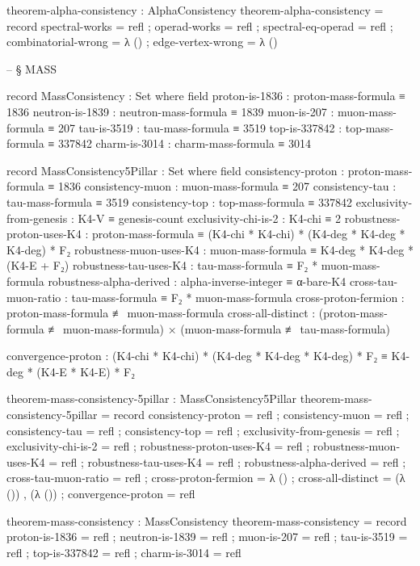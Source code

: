 \documentclass[11pt,a4paper]{book}
\begin{document}
\begin{code}
theorem-alpha-consistency : AlphaConsistency
theorem-alpha-consistency = record
  { spectral-works     = refl
  ; operad-works       = refl
  ; spectral-eq-operad = refl
  ; combinatorial-wrong = λ ()
  ; edge-vertex-wrong   = λ ()
  }


-- § MASS

record MassConsistency : Set where
  field
    proton-is-1836   : proton-mass-formula ≡ 1836
    neutron-is-1839  : neutron-mass-formula ≡ 1839
    muon-is-207      : muon-mass-formula ≡ 207
    tau-is-3519      : tau-mass-formula ≡ 3519
    top-is-337842    : top-mass-formula ≡ 337842
    charm-is-3014    : charm-mass-formula ≡ 3014

record MassConsistency5Pillar : Set where
  field
    consistency-proton : proton-mass-formula ≡ 1836
    consistency-muon : muon-mass-formula ≡ 207
    consistency-tau : tau-mass-formula ≡ 3519
    consistency-top : top-mass-formula ≡ 337842
    exclusivity-from-genesis : K4-V ≡ genesis-count
    exclusivity-chi-is-2 : K4-chi ≡ 2
    robustness-proton-uses-K4 : proton-mass-formula ≡ (K4-chi * K4-chi) * (K4-deg * K4-deg * K4-deg) * F₂
    robustness-muon-uses-K4 : muon-mass-formula ≡ K4-deg * K4-deg * (K4-E + F₂)
    robustness-tau-uses-K4 : tau-mass-formula ≡ F₂ * muon-mass-formula
    robustness-alpha-derived : alpha-inverse-integer ≡ α-bare-K4
    cross-tau-muon-ratio : tau-mass-formula ≡ F₂ * muon-mass-formula
    cross-proton-fermion : proton-mass-formula ≢ muon-mass-formula
    cross-all-distinct : (proton-mass-formula ≢ muon-mass-formula) × (muon-mass-formula ≢ tau-mass-formula)
    
    convergence-proton : (K4-chi * K4-chi) * (K4-deg * K4-deg * K4-deg) * F₂ ≡ K4-deg * (K4-E * K4-E) * F₂

theorem-mass-consistency-5pillar : MassConsistency5Pillar
theorem-mass-consistency-5pillar = record
  { consistency-proton = refl
  ; consistency-muon = refl
  ; consistency-tau = refl
  ; consistency-top = refl
  ; exclusivity-from-genesis = refl
  ; exclusivity-chi-is-2 = refl
  ; robustness-proton-uses-K4 = refl
  ; robustness-muon-uses-K4 = refl
  ; robustness-tau-uses-K4 = refl
  ; robustness-alpha-derived = refl
  ; cross-tau-muon-ratio = refl
  ; cross-proton-fermion = λ ()
  ; cross-all-distinct = (λ ()) , (λ ())
  ; convergence-proton = refl
  }

theorem-mass-consistency : MassConsistency
theorem-mass-consistency = record
  { proton-is-1836   = refl
  ; neutron-is-1839  = refl
  ; muon-is-207      = refl
  ; tau-is-3519      = refl
  ; top-is-337842    = refl
  ; charm-is-3014    = refl
  }


\end{code}
\end{document}
